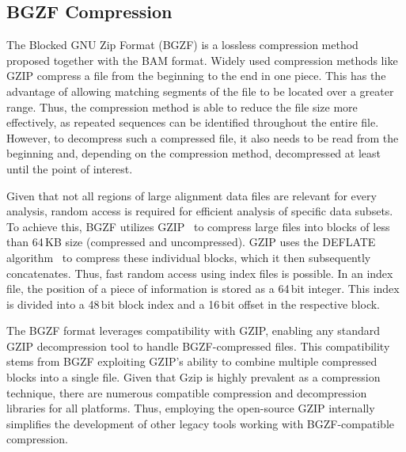 \subsection{BGZF Compression} \label{bgzf}
The Blocked GNU Zip Format (BGZF) is a lossless compression method proposed together with the BAM format. Widely used compression methods like GZIP compress a file from the beginning to the end in one piece. This has the advantage of allowing matching segments of the file to be located over a greater range. Thus, the compression method is able to reduce the file size more effectively, as repeated sequences can be identified throughout the entire file. However, to decompress such a compressed file, it also needs to be read from the beginning and, depending on the compression method, decompressed at least until the point of interest. 

Given that not all regions of large alignment data files are relevant for every analysis, random access is required for efficient analysis of specific data subsets. To achieve this, BGZF utilizes GZIP~\cite{gzip} to compress large files into blocks of less than 64\,KB size (compressed and uncompressed). GZIP uses the DEFLATE algorithm~\cite{deflate} to compress these individual blocks, which it then subsequently concatenates. Thus, fast random access using index files is possible. In an index file, the position of a piece of information is stored as a 64\,bit integer. This index is divided into a 48\,bit block index and a 16\,bit offset in the respective block.

The BGZF format leverages compatibility with GZIP, enabling any standard GZIP decompression tool to handle BGZF-compressed files. This compatibility stems from BGZF exploiting GZIP's ability to combine multiple compressed blocks into a single file. Given that Gzip is highly prevalent as a compression technique, there are numerous compatible compression and decompression libraries for all platforms. Thus, employing the open-source GZIP internally simplifies the development of other legacy tools working with BGZF-compatible compression.  

